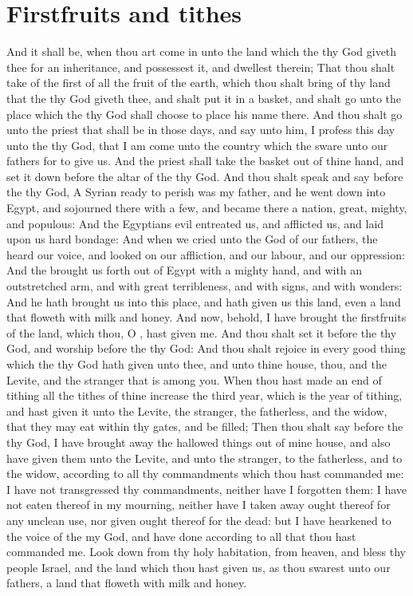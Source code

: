 \section*{Firstfruits and tithes}
\begin{biblechapter} %
\verse And it shall be, when thou art come in unto the land which the \LORD thy God giveth thee for an inheritance, and possessest it, and dwellest therein;
\verse That thou shalt take of the first of all the fruit of the earth, which thou shalt bring of thy land that the \LORD thy God giveth thee, and shalt put it in a basket, and shalt go unto the place which the \LORD thy God shall choose to place his name there.
\verse And thou shalt go unto the priest that shall be in those days, and say unto him, I profess this day unto the \LORD thy God, that I am come unto the country which the \LORD sware unto our fathers for to give us.
\verse And the priest shall take the basket out of thine hand, and set it down before the altar of the \LORD thy God.
\verse And thou shalt speak and say before the \LORD thy God, A Syrian ready to perish was my father, and he went down into Egypt, and sojourned there with a few, and became there a nation, great, mighty, and populous:
\verse And the Egyptians evil entreated us, and afflicted us, and laid upon us hard bondage:
\verse And when we cried unto the \LORD God of our fathers, the \LORD heard our voice, and looked on our affliction, and our labour, and our oppression:
\verse And the \LORD brought us forth out of Egypt with a mighty hand, and with an outstretched arm, and with great terribleness, and with signs, and with wonders:
\verse And he hath brought us into this place, and hath given us this land, even a land that floweth with milk and honey.
\verse And now, behold, I have brought the firstfruits of the land, which thou, O \LORD, hast given me. And thou shalt set it before the \LORD thy God, and worship before the \LORD thy God:
\verse And thou shalt rejoice in every good thing which the \LORD thy God hath given unto thee, and unto thine house, thou, and the Levite, and the stranger that is among you.
\verse When thou hast made an end of tithing all the tithes of thine increase the third year, which is the year of tithing, and hast given it unto the Levite, the stranger, the fatherless, and the widow, that they may eat within thy gates, and be filled;
\verse Then thou shalt say before the \LORD thy God, I have brought away the hallowed things out of mine house, and also have given them unto the Levite, and unto the stranger, to the fatherless, and to the widow, according to all thy commandments which thou hast commanded me: I have not transgressed thy commandments, neither have I forgotten them:
\verse I have not eaten thereof in my mourning, neither have I taken away ought thereof for any unclean use, nor given ought thereof for the dead: but I have hearkened to the voice of the \LORD my God, and have done according to all that thou hast commanded me.
\verse Look down from thy holy habitation, from heaven, and bless thy people Israel, and the land which thou hast given us, as thou swarest unto our fathers, a land that floweth with milk and honey.

\end{biblechapter}
